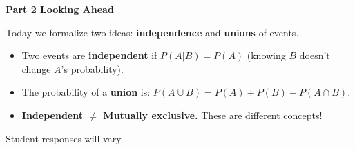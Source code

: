 \documentclass[10pt]{article}
\begin{document}
\vspace{0.28in}

{\large\bfseries\color{navy} Part 2 \quad Looking Ahead}

\vspace{0.12in}

\noindent Today we formalize two ideas: \textbf{independence} and \textbf{unions} of events.

\vspace{0.14in}

\begin{tcolorbox}[colback=greenbg, colframe=greenacc, boxrule=0.8pt, arc=2mm,
    left=4mm, right=4mm, top=3mm, bottom=3mm]
    \small
    \begin{itemize}[leftmargin=1.3em, itemsep=8pt]
      \item Two events are \textbf{independent} if $P(A|B) = P(A)$ (knowing $B$ doesn't change $A$'s probability).
      \item The probability of a \textbf{union} is: $P(A \cup B) = P(A) + P(B) - P(A \cap B)$.
      \item \textbf{Independent $\neq$ Mutually exclusive.} These are different concepts!
    \end{itemize}
\end{tcolorbox}

\vspace{0.2in}

\noindent\textcolor{slate}{\small Student responses will vary.}
\end{document}
